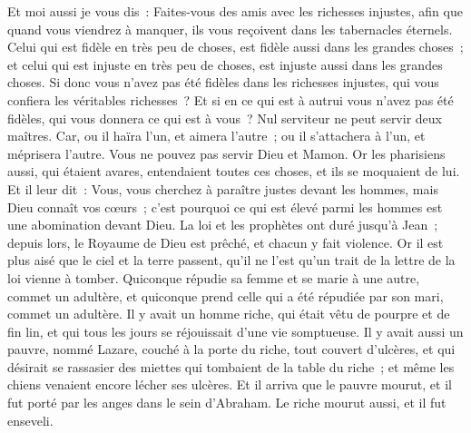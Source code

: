 \begin{multicols}{2}
Et moi aussi je vous dis~: Faites-vous des amis avec les richesses injustes, afin que quand vous viendrez à manquer, ils vous reçoivent dans les tabernacles éternels.
Celui qui est fidèle en très peu de choses, est fidèle aussi dans les grandes choses~; et celui qui est injuste en très peu de choses, est injuste aussi dans les grandes choses.
Si donc vous n'avez pas été fidèles dans les richesses injustes, qui vous confiera les véritables richesses~?
Et si en ce qui est à autrui vous n'avez pas été fidèles, qui vous donnera ce qui est à vous~?
Nul serviteur ne peut servir deux maîtres. Car, ou il haïra l'un, et aimera l'autre~; ou il s'attachera à l'un, et méprisera l'autre. Vous ne pouvez pas servir Dieu et Mamon.
Or les pharisiens aussi, qui étaient avares, entendaient toutes ces choses, et ils se moquaient de lui.
Et il leur dit~: Vous, vous cherchez à paraître justes devant les hommes, mais Dieu connaît vos cœurs~; c'est pourquoi ce qui est élevé parmi les hommes est une abomination devant Dieu.
La loi et les prophètes ont duré jusqu'à Jean~; depuis lors, le Royaume de Dieu est prêché, et chacun y fait violence.
Or il est plus aisé que le ciel et la terre passent, qu'il ne l'est qu'un trait de la lettre de la loi vienne à tomber.
Quiconque répudie sa femme et se marie à une autre, commet un adultère, et quiconque prend celle qui a été répudiée par son mari, commet un adultère.
Il y avait un homme riche, qui était vêtu de pourpre et de fin lin, et qui tous les jours se réjouissait d'une vie somptueuse.
Il y avait aussi un pauvre, nommé Lazare, couché à la porte du riche, tout couvert d'ulcères,
et qui désirait se rassasier des miettes qui tombaient de la table du riche~; et même les chiens venaient encore lécher ses ulcères.
Et il arriva que le pauvre mourut, et il fut porté par les anges dans le sein d'Abraham. Le riche mourut aussi, et il fut enseveli.

\end{multicols}

